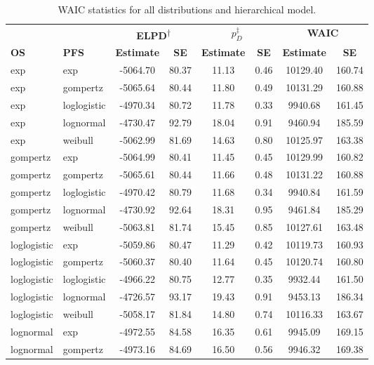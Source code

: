 \documentclass[AMA,STIX1COL]{WileyNJD-v2}
\begin{document}
\begin{table}[H]
\caption{WAIC statistics for all distributions and hierarchical model. \label{tab:waic_hier}}
\centering
\begin{tabular}{l l c c c c c c}
\toprule
\multicolumn{1}{l}{} & \multicolumn{1}{l}{} & \multicolumn{2}{c}{\textbf{ELPD\textsuperscript{$\dagger$}}} & \multicolumn{2}{c}{\textbf{$p_D^{\ddagger}$}} & \multicolumn{2}{c}{\textbf{WAIC}} \\
\cmidrule{3-4}\cmidrule{5-6}\cmidrule{7-8}
\textbf{OS} & \textbf{PFS} & \textbf{Estimate} & \textbf{SE} & \textbf{Estimate} & \textbf{SE} & \textbf{Estimate} & \textbf{SE}\\
\midrule
exp & exp & -5064.70 & 80.37 & 11.13 & 0.46 & 10129.40 & 160.74\\
exp & gompertz & -5065.64 & 80.44 & 11.80 & 0.49 & 10131.29 & 160.88\\
exp & loglogistic & -4970.34 & 80.72 & 11.78 & 0.33 & 9940.68 & 161.45\\
exp & lognormal & -4730.47 & 92.79 & 18.04 & 0.91 & 9460.94 & 185.59\\
exp & weibull & -5062.99 & 81.69 & 14.63 & 0.80 & 10125.97 & 163.38\\
gompertz & exp & -5064.99 & 80.41 & 11.45 & 0.45 & 10129.99 & 160.82\\
gompertz & gompertz & -5065.61 & 80.44 & 11.66 & 0.48 & 10131.22 & 160.88\\
gompertz & loglogistic & -4970.42 & 80.79 & 11.68 & 0.34 & 9940.84 & 161.59\\
gompertz & lognormal & -4730.92 & 92.64 & 18.31 & 0.95 & 9461.84 & 185.29\\
gompertz & weibull & -5063.81 & 81.74 & 15.45 & 0.85 & 10127.61 & 163.48\\
loglogistic & exp & -5059.86 & 80.47 & 11.29 & 0.42 & 10119.73 & 160.93\\
loglogistic & gompertz & -5060.37 & 80.40 & 11.64 & 0.45 & 10120.74 & 160.80\\
loglogistic & loglogistic & -4966.22 & 80.75 & 12.77 & 0.35 & 9932.44 & 161.50\\
loglogistic & lognormal & -4726.57 & 93.17 & 19.43 & 0.91 & 9453.13 & 186.34\\
loglogistic & weibull & -5058.17 & 81.84 & 14.80 & 0.74 & 10116.33 & 163.67\\
lognormal & exp & -4972.55 & 84.58 & 16.35 & 0.61 & 9945.09 & 169.15\\
lognormal & gompertz & -4973.16 & 84.69 & 16.50 & 0.56 & 9946.32 & 169.38\\

\end{tabular}
\end{table}
\end{document}
